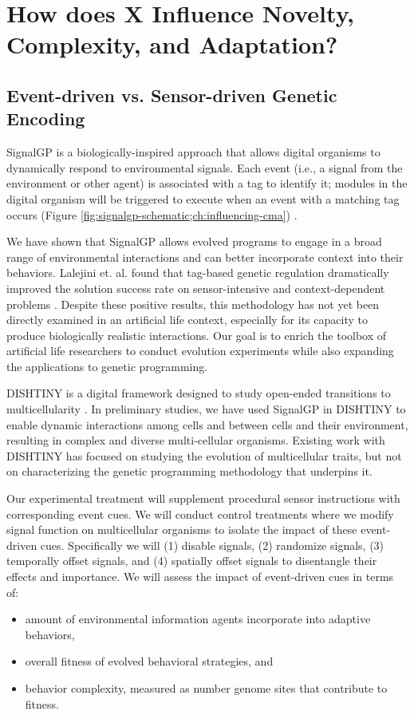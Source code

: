 \chapter{How does X Influence Novelty, Complexity, and Adaptation?}
\label{ch:influencing-cna}

\section{Event-driven vs. Sensor-driven Genetic Encoding}

SignalGP is a biologically-inspired approach that allows digital organisms to dynamically respond to environmental signals.
Each event (i.e., a signal from the environment or other agent) is associated with a tag to identify it; modules in the digital organism will be triggered to execute when an event with a matching tag occurs (Figure \ref{fig:signalgp-schematic;ch:influencing-cma}) \citep{lalejini2018evolving}.

We have shown that SignalGP allows evolved programs to engage in a broad range of environmental interactions and can better incorporate context into their behaviors.
Lalejini et. al. found that tag-based genetic regulation dramatically improved the solution success rate on sensor-intensive and context-dependent problems \citep{lalejini2018evolving, lalejini2021tag}.
Despite these positive results, this methodology has not yet been directly examined in an artificial life context, especially for its capacity to produce biologically realistic interactions.
Our goal is to enrich the toolbox of artificial life researchers to conduct evolution experiments while also expanding the applications to genetic programming.



DISHTINY is a digital framework designed to study open-ended transitions to multicellularity \citep{moreno2019toward}.
In preliminary studies, we have used SignalGP in DISHTINY to enable dynamic interactions among cells and between cells and their environment, resulting in complex and diverse multi-cellular organisms.
Existing work with DISHTINY has focused on studying the evolution of multicellular traits, but not on characterizing the genetic programming methodology that underpins it.

Our experimental treatment will supplement procedural sensor instructions with corresponding event cues.
We will conduct control treatments where we modify signal function on multicellular organisms to isolate the impact of these event-driven cues.  Specifically we will (1) disable signals, (2) randomize signals, (3) temporally offset signals, and (4) spatially offset signals to disentangle their effects and importance.
We will assess the impact of event-driven cues in terms of:
\begin{itemize}
\item amount of environmental information agents incorporate into adaptive behaviors,
\item overall fitness of evolved behavioral strategies, and
\item behavior complexity, measured as number genome sites that contribute to fitness.
\end{itemize}

